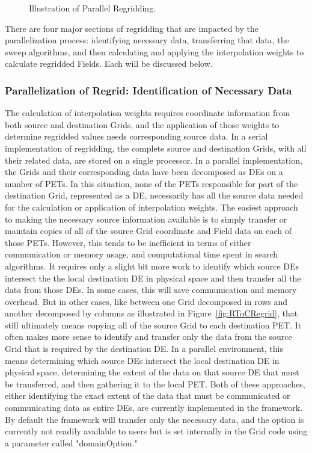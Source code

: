 \begin{center}
\begin{figure}
\caption{Illustration of Parallel Regridding. }
\label{fig:ParallelRegrid}
\end{figure}
\end{center}

There are four major sections of regridding that are impacted by the
parallelization process: identifying necessary data, transferring that data, the
sweep algorithms, and then calculating and applying the interpolation weights to
calculate regridded Fields.  Each will be discussed below.

\subsubsection{Parallelization of Regrid: Identification of Necessary Data}

The calculation of interpolation weights requires coordinate information from
both source and destination Grids, and the application of those weights to
determine regridded values needs corresponding source data.  In a serial
implementation of regridding, the complete source and destination Grids, with
all their related data, are stored on a single processor.  In a parallel
implementation, the Grids and their corresponding data have been decomposed as
DEs on a number of PETs.  In this situation, none of the PETs responsible for
part of the destination Grid, represented as a DE, necessarily has all the source
data needed for the calculation or application of interpolation weights.  The
easiest approach to making the necessary source information available is to
simply transfer or maintain copies of all of the source Grid coordinate and Field
data on each of those PETs.  However, this tends to be inefficient in terms of
either communication or memory usage, and computational time spent in search
algorithms.  It requires only a slight bit more work to identify which source DEs
intersect the the local destination DE in physical space and then transfer all
the data from those DEs.  In some cases, this will save communication and memory
overhead.  But in other cases, like between one Grid decomposed in rows and
another decomposed by columns as illustrated in Figure~\ref{fig:RToCRegrid}, that
still ultimately means copying all of the source Grid to each destination PET.
It often makes more sense to identify and transfer only the data from the
source Grid that is required by the destination DE.  In a parallel environment,
this means determining which source DEs intersect the local destination DE in
physical space, determining the extent of the data on that source DE that must
be transferred, and then gathering it to the local PET.  Both of these
approaches, either identifying the exact extent of the data that must be
communicated or communicating data as entire DEs, are currently implemented in
the framework.  By default the framework will transfer only the necessary data,
and the option is currently not readily available to users but is set internally
in the Grid code using a parameter called "domainOption."

